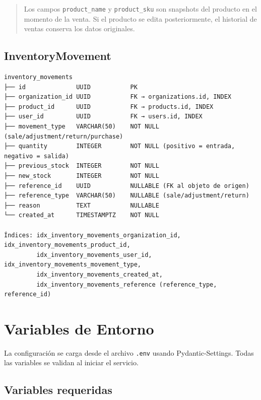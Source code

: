 \begin{quote}
Los campos \texttt{product\_name} y \texttt{product\_sku} son snapshots del producto en el momento de la venta. Si el producto se edita posteriormente, el historial de ventas conserva los datos originales.
\end{quote}

\subsection{InventoryMovement}\label{inventorymovement}

\begin{verbatim}
inventory_movements
├── id              UUID           PK
├── organization_id UUID           FK → organizations.id, INDEX
├── product_id      UUID           FK → products.id, INDEX
├── user_id         UUID           FK → users.id, INDEX
├── movement_type   VARCHAR(50)    NOT NULL (sale/adjustment/return/purchase)
├── quantity        INTEGER        NOT NULL (positivo = entrada, negativo = salida)
├── previous_stock  INTEGER        NOT NULL
├── new_stock       INTEGER        NOT NULL
├── reference_id    UUID           NULLABLE (FK al objeto de origen)
├── reference_type  VARCHAR(50)    NULLABLE (sale/adjustment/return)
├── reason          TEXT           NULLABLE
└── created_at      TIMESTAMPTZ    NOT NULL

Índices: idx_inventory_movements_organization_id, idx_inventory_movements_product_id,
         idx_inventory_movements_user_id, idx_inventory_movements_movement_type,
         idx_inventory_movements_created_at,
         idx_inventory_movements_reference (reference_type, reference_id)
\end{verbatim}

\section{Variables de Entorno}\label{variables-de-entorno}

La configuración se carga desde el archivo \texttt{.env} usando Pydantic-Settings. Todas las variables se validan al iniciar el servicio.

\subsection{Variables requeridas}\label{variables-requeridas}

